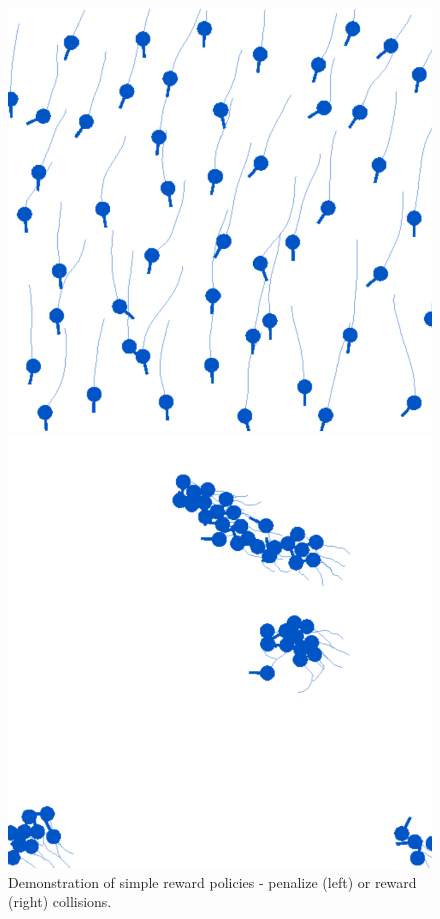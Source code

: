 \documentclass[9pt]{IEEEtran}
\begin{document}
\begin{figure}[hbt]
    \centering
    \begin{minipage}{0.2\textwidth}
        \centering
        \includegraphics[width=\textwidth]{avoid.png}
    \end{minipage}
    \begin{minipage}{0.2\textwidth}
        \centering
        \includegraphics[width=\textwidth]{touch.png}
    \end{minipage}
    \caption{Demonstration of simple reward policies - penalize (left) or reward (right) collisions.}
    \label{fig:demo}
\end{figure}
\end{document}
